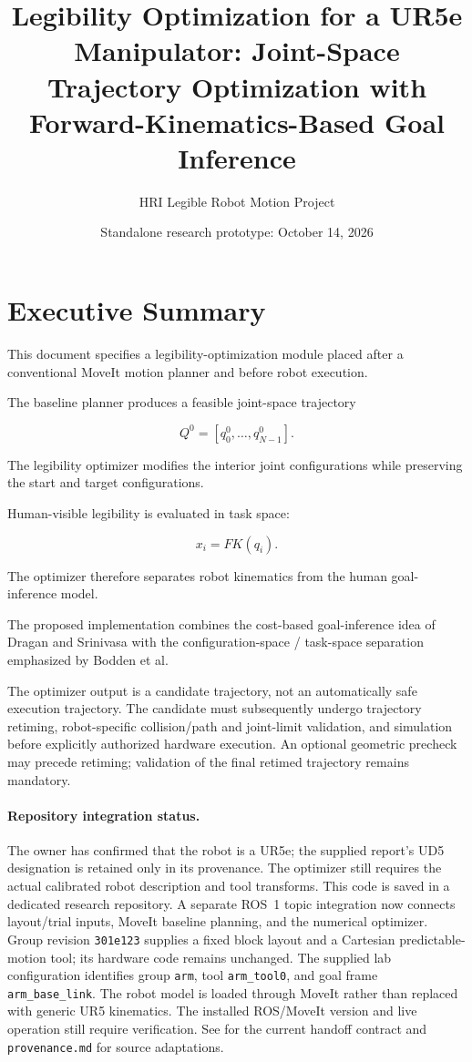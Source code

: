\documentclass[11pt]{article}
\title{
Legibility Optimization for a UR5e Manipulator:
Joint-Space Trajectory Optimization with
Forward-Kinematics-Based Goal Inference
}
\author{
HRI Legible Robot Motion Project
}
\date{Standalone research prototype: October 14, 2026}
\begin{document}
\maketitle

\section*{Executive Summary}

This document specifies a legibility-optimization module
placed after a conventional MoveIt motion planner and before
robot execution.

The baseline planner produces a feasible joint-space trajectory

\[
Q^0 = [q_0^0,\ldots,q_{N-1}^0].
\]

The legibility optimizer modifies the interior joint
configurations while preserving the start and target
configurations.

Human-visible legibility is evaluated in task space:

\[
x_i = FK(q_i).
\]

The optimizer therefore separates robot kinematics from the
human goal-inference model.

The proposed implementation combines the cost-based
goal-inference idea of Dragan and Srinivasa with the
configuration-space / task-space separation emphasized by
Bodden et al.

The optimizer output is a candidate trajectory, not an
automatically safe execution trajectory. The candidate must
subsequently undergo trajectory retiming, robot-specific collision/path and
joint-limit validation, and simulation before explicitly authorized hardware
execution. An optional geometric precheck may precede retiming; validation
of the final retimed trajectory remains mandatory.

\paragraph{Repository integration status.}
The owner has confirmed that the robot is a UR5e; the supplied report's UD5
designation is retained only in its provenance. The optimizer still requires
the actual calibrated robot description and tool transforms.
This code is saved in a dedicated research repository. A separate ROS~1 topic
integration now connects layout/trial inputs, MoveIt baseline planning, and the
numerical optimizer. Group revision \texttt{301e123} supplies a fixed block layout
and a Cartesian predictable-motion tool; its hardware code remains unchanged.
The supplied lab configuration identifies group \texttt{arm}, tool
\texttt{arm\_tool0}, and goal frame \texttt{arm\_base\_link}. The robot model is
loaded through MoveIt rather than replaced with generic UR5 kinematics.
The installed ROS/MoveIt version and live operation still require verification.
See  for the current handoff contract and
\texttt{provenance.md} for source adaptations.
\end{document}
